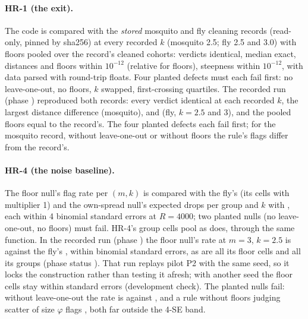 \paragraph{HR-1 (the exit).} The code is compared with the \emph{stored} mosquito and fly cleaning records (read-only,
pinned by sha256) at every recorded $k$ (mosquito 2.5; fly 2.5 and 3.0) with floors pooled over the record's cleaned
cohorts: verdicts identical, median exact, distances and floors within $10^{-12}$ (relative for floors), steepness
within $10^{-12}$, with data parsed with round-trip floats. Four planted defects must each fail first: no
leave-one-out, no floors, $k$ swapped, first-crossing quartiles.
The recorded run (phase ) reproduced both records: every verdict identical at each recorded $k$, the
largest distance difference  (mosquito),  and  (fly, $k=2.5$ and 3), and the pooled floors equal to the record's. The four planted defects each fail first;
for the mosquito record, without leave-one-out or without floors the rule's flags differ from the record's.
\paragraph{HR-4 (the noise baseline).} The floor null's flag rate per $(m,k)$ is compared with the fly's
 (its cells with multiplier 1) and the own-spread null's expected drops per group and $k$ with
, each within 4 binomial standard errors at $R=4000$; two planted nulls (no leave-one-out, no
floors) must fail.
HR-4's group cells pool as  does, through the same function. In the recorded run (phase )
the floor null's rate at $m=3$, $k=2.5$ is  against the fly's , within  binomial standard errors, as are all its floor cells and all its groups (phase status ).
That run replays pilot P2 with the same seed, so it locks the construction rather than testing it afresh; with another
seed the floor cells stay within  standard errors (development check). The planted nulls fail: without leave-one-out the rate is  against , and a rule without floors judging scatter of size $\varphi$ flags , both far outside the 4-SE band.

